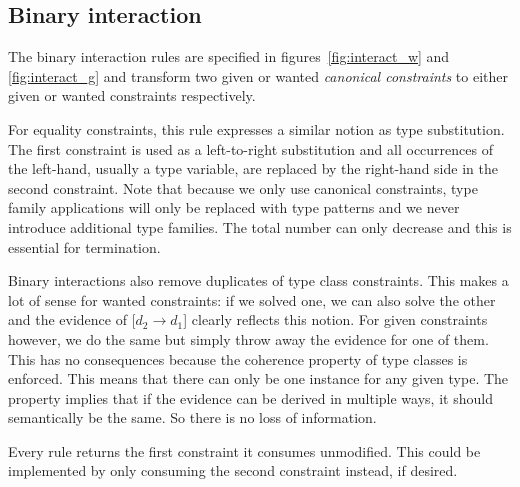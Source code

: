 \subsection{Binary interaction}
\label{sec:binary-interaction}
The binary interaction rules are specified in figures~\ref{fig:interact_w} and
\ref{fig:interact_g} and transform two given or wanted \textit{canonical
constraints} to either given or wanted constraints respectively.

For equality constraints, this rule expresses a similar notion as type
substitution. The first constraint is used as a left-to-right substitution and
all occurrences of the left-hand, usually a type variable, are replaced by the
right-hand side in the second constraint. Note that because we only use
canonical constraints, type family applications will only be replaced with type
patterns and we never introduce additional type families. The total number can
only decrease and this is essential for termination.

Binary interactions also remove duplicates of type class constraints. This
makes a lot of sense for wanted constraints: if we solved one, we can also solve
the other and the evidence of $[d_2 \rightarrow d_1$] clearly reflects this
notion. For given constraints however, we do the same but simply throw away the
evidence for one of them. This has no consequences because the coherence
property of type classes is enforced. This means that there can only be one
instance for any given type. The property implies that if the evidence can be
derived in multiple ways, it should semantically be the same. So there is no
loss of information.

Every rule returns the first constraint it consumes unmodified. This
could be implemented by only consuming the second constraint instead, if desired.

